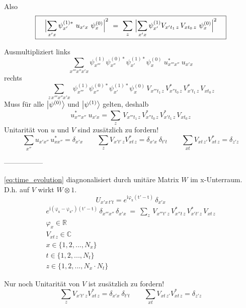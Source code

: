 \documentclass[12pt]{article}
\begin{document}
Also 
\begin{equation} 
\boxed{
\quad\Bigl| \sum_{x'x} \psi^{(1)*}_{x'}\ u_{x'x}\ \psi^{(0)}_x \Bigr|^2 
\ =\ \sum_{z}\ \Bigl|\sum_{x'x} \psi^{(1)}_{x'} V_{x't_1\, z}\, V_{xt_0\, z}\ \psi^{(0)}_{x} \Bigr|^2 \quad
}
\end{equation}

Ausmultipliziert links
\begin{equation} 
\sum_{x'''x''x'x}\psi^{(1)}_{x'''}\psi^{(0)*}_{x''}\psi^{(1)*}_{x'}\psi^{(0)}_x
\ u^*_{x'''x''}\ u_{x'x}
\end{equation}
rechts
\begin{equation} 
\sum_{z\,x'''x''x'x}\ 
\psi^{(1)}_{x'''}\psi^{(0)*}_{x''}\psi^{(1)*}_{x'}\psi^{(0)}_{x}
\, V_{x'''t_1\, z}\, V^*_{x''t_0\, z}\, V^*_{x't_1\, z}\, V_{xt_0\, z}
\end{equation}
Muss für alle $\ket{\psi^{(0)}}$ und $\ket{\psi^{(1)}}$ gelten, deshalb
\begin{equation} 
\boxed{
u^*_{x'''x''}\ u_{x'x} = \sum_z \, V_{x'''t_1\, z}\, V^*_{x''t_0\, z}\, V^*_{x't_1\, z}\, V_{xt_0\, z} 
}
\end{equation}
Unitarität von $u$ und $V$ sind zusätzlich zu fordern!
\begin{equation} 
\sum_{x''} u_{x'x''}\, u^*_{xx''} = \delta_{x'x} \quad\quad 
\sum_{z} V_{x't'\, z} V^*_{xt\, z} = \delta_{x'x}\ \delta_{t't} \quad\quad
\sum_{xt} V_{xt\, z'} V^*_{xt\, z} = \delta_{z'z}
\end{equation}

-----------------

\eqref{eq:time_evolution} diagnonalisiert durch unitäre Matrix $W$ im x-Unterraum. D.h. auf $V$ wirkt $W \otimes \mathrm{1}$.
\begin{equation}
U_{x'x\,t't} = e^\mathrm{i\varphi_x(t'-t)}\,\delta_{x'x}
\end{equation}
\begin{equation}
\begin{split}
\boxed{
e^\mathrm{i(\varphi_x-\varphi_{x''})(t'-t)}\,\delta_{x'''x''}\,\delta_{x'x}\ =\ \sum_z \, V_{x'''t'\, z}\, V^*_{x''t\, z}\, V^*_{x't'\, z}\, V_{xt\, z} 
} \\
\varphi_x \in \mathbb{R} \\ V_{xt\, z} \in \mathbb{C} \\
x \in \{1,2,...,N_x\}\\ t \in \{1,2,...,N_t\}\\ z \in \{1,2,...,N_x \cdot N_t\} 
\end{split}
\end{equation}

Nur noch Unitarität von $V$ ist zusätzlich zu fordern!
\begin{equation} 
\sum_{z} V_{x't'\, z} V^*_{xt\, z} = \delta_{x'x}\ \delta_{t't} \quad\quad
\sum_{xt} V_{xt\, z'} V^*_{xt\, z} = \delta_{z'z}
\end{equation}
\end{document}
